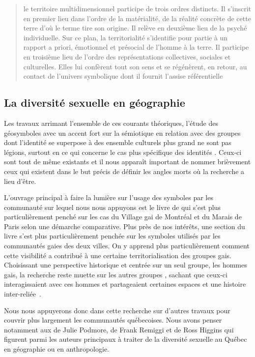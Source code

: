 \blockquote[{\cite[108]{DiMeo1998}}][.]{\textelp{} le territoire multidimensionnel
  participe de trois ordres distincts. Il s'inscrit en premier lieu dans l'ordre
  de la matérialité, de la réalité concrète de cette terre d'où le terme tire
  son origine. Il relève en deuxième lieu de la psyché individuelle. Sur ce
  plan, la territorialité s'identifie pour partie à un rapport a priori,
  émotionnel et présocial de l'homme à la terre. Il participe en troisième lieu
  de l'ordre des représentations collectives, sociales et culturelles. Elles lui
  confèrent tout son sens et se régénèrent, en retour, au contact de l'univers
  symbolique dont il fournit l'assise référentielle}.



\subsection{La diversité sexuelle en géographie}
\label{sec:la_diversit_sexuelle_en_g_ographie}  
Les travaux arrimant l'ensemble de ces courants théoriques, l'étude des géosymboles avec un accent fort sur la sémiotique en relation avec des groupes dont l'identité se superpose à des ensemble culturels plus grand ne sont pas légions, surtout en ce qui concerne le cas plus spécifique des identités \lgbt{}. 
Ceux-ci sont tout de même existants et il nous apparaît important de nommer brièvement ceux qui existent dans le but précis de définir les angles morts où la recherche a lieu d'être.

L'ouvrage principal à faire la lumière sur l'usage des symboles par les communauté \lgbt{} sur lequel nous nous appuyons est le livre  de \citet{Giraud2014} qui s'est plus particulièrement penché sur les cas du Village gai de Montréal et du Marais de Paris selon une démarche comparative. 
Plus près de nos intérêts, une section du livre s'est plus particulièrement penchée sur les symboles utilisés par les communautés gaies des deux villes. 
On y apprend plus particulièrement comment cette visibilité a contribué à une certaine territorialisation des groupes gais. 
Choisissant une perspective historique et centrée sur un seul groupe, les hommes gais, la recherche reste muette sur les autres groupes \lgbt{}, sachant que ceux-ci interagissaient avec ces hommes et partageaient certaines espaces et une histoire inter-reliée~\citep{Remiggi2000,Demczuk1998,Podmore2001,Higgins1997,Higgins1999}.

Nous nous appuyerons donc dans cette recherche sur d'autres travaux pour couvrir plus largement les communautés \lgbt{} québecoises. 
Nous avons penser notamment aux de Julie Podmore, de Frank Remiggi et de Ross Higgins qui figurent parmi les auteurs principaux à traiter de la diversité sexuelle au Québec en géographie ou en anthropologie.

